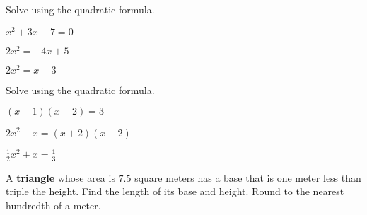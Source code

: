 \begin{exercise}
	Solve using the quadratic formula.\\
	\begin{enumerate*}[label={(\arabic*)~}]
		\item $x^2+3x-7=0$
		\item $2x^2=-4x+5$
		\item $2x^2=x-3$
		\hfill\null
	\end{enumerate*}
\end{exercise}

\vfill
\begin{center} \hfill
\end{center}

\newpage


\begin{exercise}
	Solve using the quadratic formula.\\
	\begin{enumerate*}[label={(\arabic*)~}]
		\item $(x-1)(x+2)=3$
		\item $2x^2-x=(x+2)(x-2)$
		\item $\frac12 x^2+x= \frac13$
		\hfill\null
	\end{enumerate*}
\end{exercise}

\vfill
\begin{center} \hfill
\end{center}



\begin{exercise}
	A \textbf{triangle} whose area is $7.5$ square meters has a base that is one meter less than triple the height. Find the length of its base and height. Round to the nearest hundredth of a meter.
\end{exercise}

